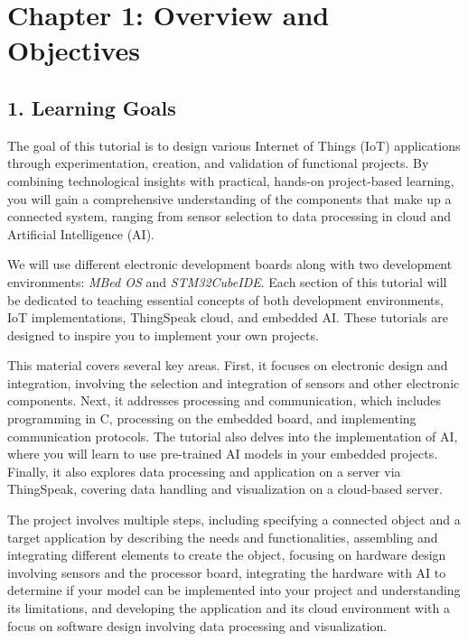 \documentclass[10pt,a4paper,onecolumn]{article}
\begin{document}
\hypertarget{chapter-1-overview-and-objectives}{%
\section{Chapter 1: Overview and
Objectives}\label{chapter-1-overview-and-objectives}}

\hypertarget{learning-goals}{%
\subsection{1. Learning Goals}\label{learning-goals}}

The goal of this tutorial is to design various Internet of Things (IoT) applications through experimentation, creation, and validation of functional projects. By combining technological insights with practical, hands-on project-based learning, you will gain a comprehensive understanding of the components that make up a connected system, ranging from sensor selection to data processing in cloud and Artificial Intelligence (AI).

We will use different electronic development boards along with two development environments: \textit{MBed OS} and \textit{STM32CubeIDE}. Each section of this tutorial will be dedicated to teaching essential concepts of both development environments, IoT implementations, ThingSpeak cloud, and embedded AI. These tutorials are designed to inspire you to implement your own projects.

This material covers several key areas. First, it focuses on electronic design and integration, involving the selection and integration of sensors and other electronic components. Next, it addresses processing and communication, which includes programming in C, processing on the embedded board, and implementing communication protocols. The tutorial also delves into the implementation of AI, where you will learn to use pre-trained AI models in your embedded projects. Finally, it also explores data processing and application on a server via ThingSpeak, covering data handling and visualization on a cloud-based server.

The project involves multiple steps, including specifying a connected object and a target application by describing the needs and functionalities, assembling and integrating different elements to create the object, focusing on hardware design involving sensors and the processor board, integrating the hardware with AI to determine if your model can be implemented into your project and understanding its limitations, and developing the application and its cloud environment with a focus on software design involving data processing and visualization.
\end{document}

